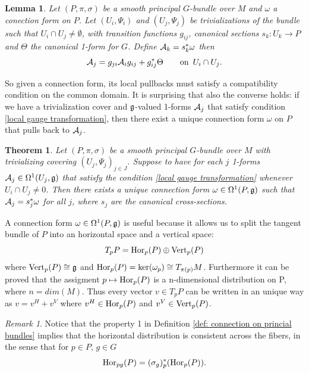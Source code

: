 \documentclass{article}
\newtheorem{thm}{Theorem}
\newtheorem{lemma}{Lemma}
\theoremstyle{definition}
\theoremstyle{remark}
\newtheorem{rmk}{Remark}
\begin{document}
\begin{lemma}
    Let \((P,\pi, \sigma)\) be a smooth principal \(G\)-bundle over \(M\) and \(\omega\) a conection form on \(P\). Let \((U_i,\Psi_i)\) and \((U_j,\Psi_j)\) be trivializations of the bundle such that \(U_i\cap U_j\not = \emptyset\), with transition functions \(g_{ij}\), canonical sections \(s_k\colon U_k\to P\) and \(\Theta\) the canonical 1-form for \(G\). Define \(\mathcal{A}_k=s_k^*\omega\) then 
    \begin{equation}\label{local gauge transformation}
        \mathcal{A}_j=g_{ji}\mathcal{A}_ig_{ij}+ g_{ij}^*\Theta \qquad \text{on }\, U_i\cap U_j.
    \end{equation}
\end{lemma}

So given a connection form, its local pullbacks must satisfy a compatibility condition on the common domain. It is surprising that also the converse holds: if we have a trivialization cover and \(\mathfrak{g}\)-valued 1-forms \(\mathcal{A}_j\) that satisfy condition \ref{local gauge transformation}, then there exist a unique connection form \(\omega\) on \(P\) that pulls back to \(\mathcal{A}_j\). 

\begin{thm}
    Let \((P,\pi, \sigma)\) be a smooth principal \(G\)-bundle over \(M\) with trivializing covering \((U_j,\Psi_j)_{j\in J}\). Suppose to have for each \(j\) 1-forms \(\mathcal{A}_j\in\Omega^1(U_j,\mathfrak{g})\) that satisfy the condition \ref{local gauge transformation} whenever \(U_i\cap U_j\not =0\). Then there exists a unique connection form \(\omega\in\Omega^1(P,\mathfrak{g})\) such that \(\mathcal{A}_j=s^*_j\omega\) for all \(j\), where \(s_j\) are the canonical cross-sections.
\end{thm}

A connection form \(\omega\in\Omega^1(P,\mathfrak{g})\) is useful because it allows us to split the tangent bundle of \(P\) into an horizontal space and a vertical space:
\[T_pP=\operatorname{Hor}_p(P)\oplus \operatorname{Vert}_p(P)\]
where \(\operatorname{Vert}_p(P)\cong \mathfrak{g}\) and \(\operatorname{Hor}_p(P)=\ker(\omega_p)\cong T_{\pi(p)}M\).
Furthermore it can be proved that the assigment \(p\mapsto \operatorname{Hor}_p(P)\) is a n-dimensional distribution on P, where \(n=dim(M)\). Thus every vector \(v\in T_pP\) can be written in an unique way as \(v=v^H+v^V\) where \(v^H\in \operatorname{Hor}_p(P)\) and \(v^V\in\operatorname{Vert}_p(P)\).

\begin{rmk}
    Notice that the property 1 in Definition \ref{def: connection on princial bundles} implies that the horizontal distribution is consistent across the fibers, in the sense that for \(p\in P,\, g\in G\)
    \[\operatorname{Hor}_{pg}(P)=(\sigma_g)_p^*(\operatorname{Hor}_p(P)).\]
\end{rmk}
\end{document}

